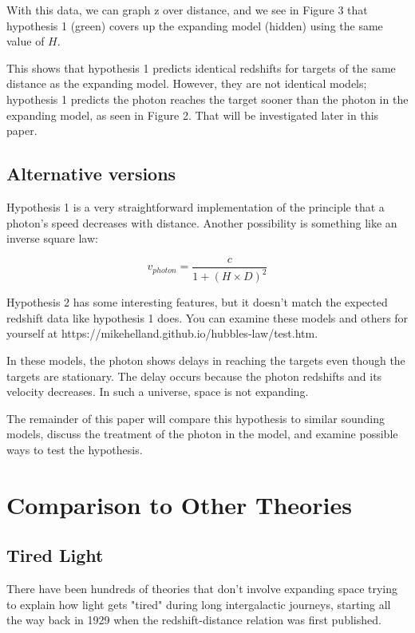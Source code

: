 \documentclass{ws-mpla}
\begin{document}
With this data, we can graph z over distance, and we see in Figure 3 that hypothesis 1 (green) covers up the expanding model (hidden) using the same value of $H$. 

This shows that hypothesis 1 predicts identical redshifts for targets of the same distance as the expanding model.
However, they are not identical models; hypothesis 1 predicts the photon reaches the target sooner than the 
photon in the expanding model, as seen in Figure 2. That will be investigated later in this paper.

\subsection{Alternative versions}

Hypothesis 1 is a very straightforward implementation of the principle that a photon's speed decreases with distance. Another possibility is something like an inverse square law:

\begin{equation}
v_{photon} = \frac{c}{1 + (H \times D)^2}
\end{equation}

Hypothesis 2 has some interesting features, but it doesn't match the expected redshift data like hypothesis 1 does. 
You can examine these models and others for yourself at https://mikehelland.github.io/hubbles-law/test.htm.

In these models, the photon shows delays in reaching the targets even though the targets are stationary. The delay occurs because the photon redshifts and its velocity decreases. In such a universe, space is not expanding. 

The remainder of this paper will compare this hypothesis to similar sounding models, discuss the treatment of the photon in the model, and examine possible ways to test the hypothesis.

\section{Comparison to Other Theories}

\subsection{Tired Light}

There have been hundreds of theories that don't involve expanding space trying to explain how light gets "tired" during long intergalactic journeys, starting all the way back in 1929 when the redshift-distance relation was first published.\cite{Reboul} 
\end{document}
